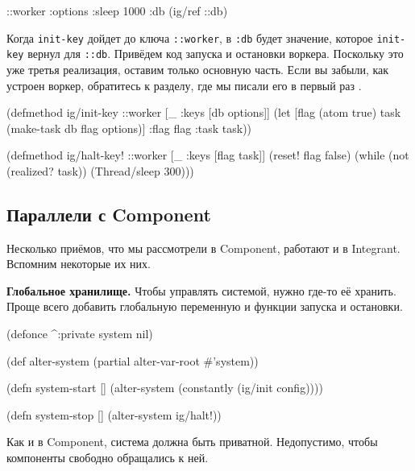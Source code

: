 \begin{english}
  \begin{clojure}
{::worker {:options {:sleep 1000}
           :db (ig/ref ::db)}}
  \end{clojure}
\end{english}

Когда \verb|init-key| дойдет до ключа \verb|::worker|, в \verb|:db| будет
значение, которое \verb|init-key| вернул для \verb|::db|. Привёдем код
запуска и остановки воркера. Поскольку это уже третья реализация, оставим только
основную часть. Если вы забыли, как устроен воркер, обратитесь к разделу, где мы
писали его в первый раз .

\begin{english}
  \begin{clojure}
(defmethod ig/init-key ::worker
  [_ {:keys [db options]}]
  (let [flag (atom true)
        task (make-task db flag options)]
    {:flag flag :task task}))

(defmethod ig/halt-key! ::worker
  [_ {:keys [flag task]}]
  (reset! flag false)
  (while (not (realized? task))
    (Thread/sleep 300)))
  \end{clojure}
\end{english}

\subsection{Параллели с Component}

Несколько приёмов, что мы рассмотрели в Component, работают и в
Integrant. Вспомним некоторые их них.


\textbf{Глобальное хранилище.} Чтобы управлять системой, нужно где-то её
хранить. Проще всего добавить глобальную переменную и функции запуска и
остановки.

\begin{english}
  \begin{clojure}
(defonce ^:private system nil)

(def alter-system (partial alter-var-root #'system))

(defn system-start []
  (alter-system (constantly (ig/init config))))

(defn system-stop []
  (alter-system ig/halt!))
  \end{clojure}
\end{english}

Как и в Component, система должна быть приватной. Недопустимо, чтобы
компоненты свободно обращались к ней.

